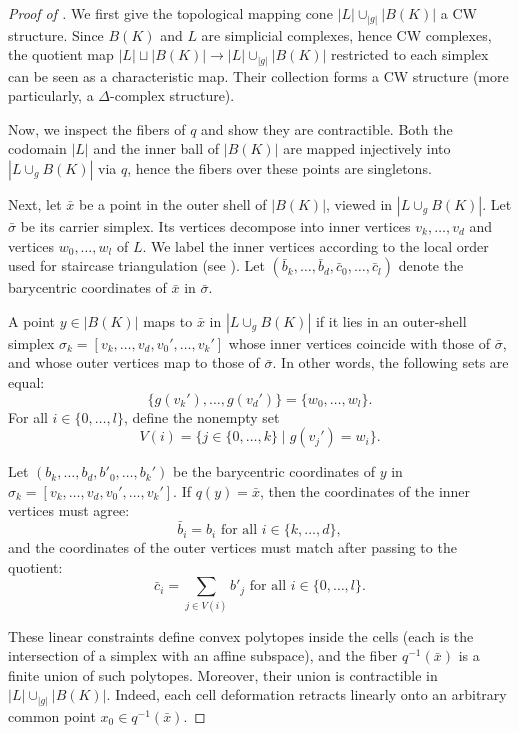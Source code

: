 \documentclass[a4paper,english,cleveref,autoref,thm-restate,nolineno]{socg-lipics-v2021}
\newcommand{\geomreal}[1] { |#1| } %
\begin{document}
\begin{proof}[Proof of ]
	\label{proof:equivalencemappingcones}
	We first give the topological mapping cone $\geomreal{L}\cup_{\geomreal{g}} \geomreal{B(K)}$ a CW structure.
	Since $B(K)$ and $L$ are simplicial complexes, hence CW complexes, the quotient map $\geomreal{L} \sqcup \geomreal{B(K)} \rightarrow \geomreal{L}\cup_{\geomreal{g}} \geomreal{B(K)}$ restricted to each simplex can be seen as a characteristic map. 
	Their collection forms a CW structure (more particularly, a $\Delta$-complex structure).
	
	Now, we inspect the fibers of $q$ and show they are contractible.
	Both the codomain $\geomreal{L}$ and the inner ball of $\geomreal{B(K)}$ are mapped injectively into $\geomreal{L\cup_g B(K)}$ via $q$, hence the fibers over these points are singletons.
	
	Next, let $\bar{x}$ be a point in the outer shell of $\geomreal{B(K)}$, viewed in $\geomreal{L\cup_g B(K)}$.
	Let $\bar{\sigma}$ be its carrier simplex.
	Its vertices decompose into inner vertices $v_k,\dots,v_d$ and vertices $w_0,\dots,w_l$ of $L$.
	We label the inner vertices according to the local order used for staircase triangulation (see ).
	Let $(\bar{b}_k,\dots,\bar{b}_d,\bar{c}_0,\dots,\bar{c}_l)$ denote the barycentric coordinates of $\bar{x}$ in $\bar{\sigma}$.

	A point $y\in\geomreal{B(K)}$ maps to $\bar{x}$ in $\geomreal{L\cup_g B(K)}$ if it lies in an outer-shell simplex $\sigma_k = [v_k,\dots,v_d,v_0',\dots,v_k']$ whose inner vertices coincide with those of $\bar{\sigma}$, and whose outer vertices map to those of $\bar{\sigma}$.
	In other words, the following sets are equal:
	\[
	\{g(v_k'),\dots,g(v_d')\}  = \{w_0,\dots,w_l\}.
	\]
	For all $i\in\{0,\dots,l\}$, define the nonempty set
	\[
	V(i) = \{j\in\{0,\dots,k\} \mid  g(v_j') = w_i \}.
	\]
	
	Let $(b_k,\dots,b_d,b'_0,\dots,b_k')$ be the barycentric coordinates of $y$ in $\sigma_k = [v_k,\dots,v_d,v_0',\dots,v_k']$.
	If $q(y)=\bar{x}$, then the coordinates of the inner vertices must agree:
	\[
	\bar{b}_i = b_i  \text{ for all } i\in\{k,\dots,d\},
	\]
	and the coordinates of the outer vertices must match after passing to the quotient:
	\[
	\bar{c}_i = \sum_{j \in V(i) } b'_j \text{ for all } i\in\{0,\dots,l\}.
	\]
	
	These linear constraints define convex polytopes inside the cells (each is the intersection of a simplex with an affine subspace), and the fiber $q^{-1}(\bar{x})$ is a finite union of such polytopes.	
	Moreover, their union is contractible in $\geomreal{L}\cup_{\geomreal{g}} \geomreal{B(K)}$.
	Indeed, each cell deformation retracts linearly onto an arbitrary common point $x_0 \in q^{-1}(\bar{x})$.
	

\end{proof}
\end{document}
